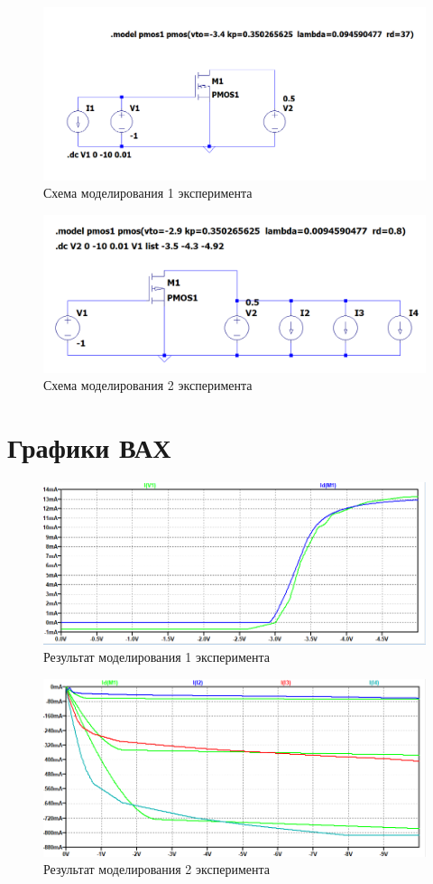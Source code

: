 \documentclass[a4paper,14pt]{article}
\begin{document}
\begin{figure}[H]
	\centering
	\includegraphics[width=\linewidth]{image/scema_1}
	\caption{Схема моделирования 1 эксперимента}
	\label{fig:scema1}
\end{figure}

\begin{figure}[H]
	\centering
	\includegraphics[width=\linewidth]{image/scema_2}
	\caption{Схема моделирования 2 эксперимента}
	\label{fig:scema2}
\end{figure}

\section{Графики ВАХ}

\begin{figure}[H]
	\centering
	\includegraphics[width=\linewidth]{image/spice_1}
	\caption{Результат моделирования 1 эксперимента}
	\label{fig:spice1}
\end{figure}

\begin{figure}[H]
	\centering
	\includegraphics[width=\linewidth]{image/spice_2}
	\caption{Результат моделирования 2 эксперимента}
	\label{fig:spice2}
\end{figure}
\end{document}
